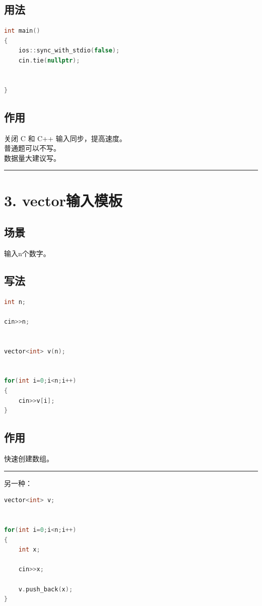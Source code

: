 \documentclass[10pt,twocolumn]{extarticle}
\begin{document}
\subsection{用法}
\begin{lstlisting}[language=C++]
int main()
{
    ios::sync_with_stdio(false);
    cin.tie(nullptr);


}
\end{lstlisting}

\subsection{作用}
关闭 C 和 C++ 输入同步，提高速度。\\
普通题可以不写。\\
数据量大建议写。

\noindent\rule{\linewidth}{0.4pt}

\section{3. vector输入模板}

\subsection{场景}
输入n个数字。

\subsection{写法}
\begin{lstlisting}[language=C++]
int n;

cin>>n;


vector<int> v(n);


for(int i=0;i<n;i++)
{
    cin>>v[i];
}
\end{lstlisting}

\subsection{作用}
快速创建数组。

\noindent\rule{\linewidth}{0.4pt}

另一种：
\begin{lstlisting}[language=C++]
vector<int> v;


for(int i=0;i<n;i++)
{
    int x;

    cin>>x;

    v.push_back(x);
}
\end{lstlisting}
\end{document}
